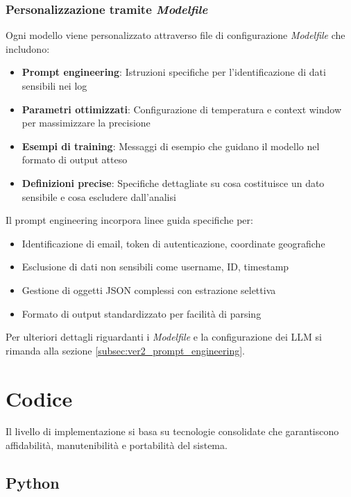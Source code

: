 \documentclass[12pt]{report}
\begin{document}
\subsubsection{Personalizzazione tramite \textit{Modelfile}}
Ogni modello viene personalizzato attraverso file di configurazione \textit{Modelfile} che includono:

\begin{itemize}
    \item \textbf{Prompt engineering}: Istruzioni specifiche per l'identificazione di dati sensibili nei log
    \item \textbf{Parametri ottimizzati}: Configurazione di temperatura e context window per massimizzare la precisione
    \item \textbf{Esempi di training}: Messaggi di esempio che guidano il modello nel formato di output atteso
    \item \textbf{Definizioni precise}: Specifiche dettagliate su cosa costituisce un dato sensibile e cosa escludere dall'analisi
\end{itemize}

Il prompt engineering incorpora linee guida specifiche per:
\begin{itemize}
    \item Identificazione di email, token di autenticazione, coordinate geografiche
    \item Esclusione di dati non sensibili come username, ID, timestamp
    \item Gestione di oggetti JSON complessi con estrazione selettiva
    \item Formato di output standardizzato per facilità di parsing
\end{itemize}

Per ulteriori dettagli riguardanti i \textit{Modelfile} e la configurazione dei LLM si rimanda alla sezione \ref{subsec:ver2_prompt_engineering}.


\section{Codice}
\label{sec:codice}

Il livello di implementazione si basa su tecnologie consolidate che garantiscono affidabilità, manutenibilità e portabilità del sistema.

\subsection{Python}
\label{subsec:python}
\end{document}
